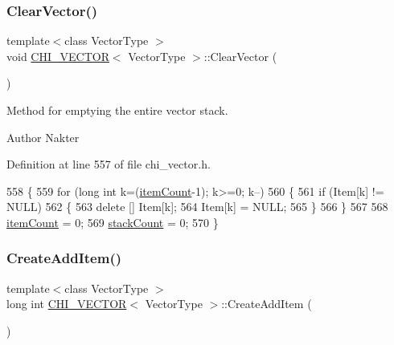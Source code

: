 \subsubsection{\texorpdfstring{Clear\+Vector()}{ClearVector()}}
{\footnotesize\ttfamily template$<$class Vector\+Type $>$ \\
void \hyperlink{class_c_h_i___v_e_c_t_o_r}{C\+H\+I\+\_\+\+V\+E\+C\+T\+OR}$<$ Vector\+Type $>$\+::Clear\+Vector (\begin{DoxyParamCaption}{ }\end{DoxyParamCaption})}

Method for emptying the entire vector stack.

\begin{DoxyAuthor}{Author}
Nakter 
\end{DoxyAuthor}


Definition at line 557 of file chi\+\_\+vector.\+h.


\begin{DoxyCode}
558 \{
559     \textcolor{keywordflow}{for} (\textcolor{keywordtype}{long} \textcolor{keywordtype}{int} k=(\hyperlink{class_c_h_i___v_e_c_t_o_r_a0d37a8a4650059da0888be2d9c38487a}{itemCount}-1); k>=0; k--)
560     \{
561         \textcolor{keywordflow}{if} (Item[k] != NULL)
562         \{
563         \textcolor{keyword}{delete} [] Item[k];
564         Item[k] = NULL;
565         \}
566     \}
567 
568     \hyperlink{class_c_h_i___v_e_c_t_o_r_a0d37a8a4650059da0888be2d9c38487a}{itemCount} = 0;
569     \hyperlink{class_c_h_i___v_e_c_t_o_r_a91ef30712b0ead293dfe1adc29fee555}{stackCount} = 0;
570 \}
\end{DoxyCode}
\mbox{\label{class_c_h_i___v_e_c_t_o_r_a638665dbc1ed89dae665c77c9fe6af18_a638665dbc1ed89dae665c77c9fe6af18}} 
\subsubsection{\texorpdfstring{Create\+Add\+Item()}{CreateAddItem()}}
{\footnotesize\ttfamily template$<$class Vector\+Type $>$ \\
long int \hyperlink{class_c_h_i___v_e_c_t_o_r}{C\+H\+I\+\_\+\+V\+E\+C\+T\+OR}$<$ Vector\+Type $>$\+::Create\+Add\+Item (\begin{DoxyParamCaption}{ }\end{DoxyParamCaption})}

